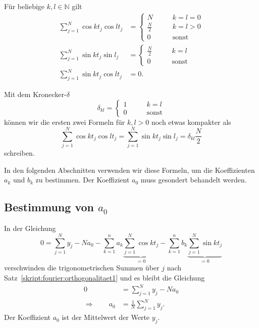 \begin{satz}
\label{skript:fourier:satzprodukte}
Für beliebige $k,l\in \mathbb N$ gilt
\begin{align*}
\sum_{j=1}^N
\cos kt_j \cos lt_j
&=
\begin{cases}
N                     &\qquad k=l=0\\
\displaystyle\frac{N}2&\qquad k=l > 0\\
0                     &\qquad\text{sonst}
\end{cases}
\\
\sum_{j=1}^N
\sin kt_j \sin l_j
&=
\begin{cases}
\displaystyle \frac{N}2&\qquad k=l\\
0                      &\qquad\text{sonst}
\end{cases}
\\
\sum_{j=1}^N
\sin kt_j \cos lt_j
&=
0.
\end{align*}
\end{satz}
Mit dem Kronecker-$\delta$ 
%
\[
\delta_{kl}
=
\begin{cases}
1&\qquad k=l\\
0&\qquad\text{sonst}
\end{cases}
\]
können wir die ersten zwei Formeln für $k,l>0$ noch etwas kompakter 
als
\begin{equation}
\sum_{j=1}^N
\cos kt_j \cos lt_j
=
\sum_{j=1}^N
\sin kt_j \sin l_j
=
\delta_{kl}\frac{N}2
\label{skript:fourier:trigsumsummary}
\end{equation}
schreiben.

In den folgenden Abschnitten verwenden wir diese Formeln, um die
Koeffizienten $a_k$ und $b_k$ zu bestimmen.
Der Koeffizient $a_0$ muss gesondert behandelt werden.

\subsection{Bestimmung von $a_0$}
In der Gleichung
\[
0
=
\sum_{j=1}^Ny_j
-Na_0
-\sum_{k=1}^na_k\underbrace{\sum_{j=1}^N\cos kt_j}_{\displaystyle=0}
-\sum_{k=1}^nb_k\underbrace{\sum_{j=1}^N\sin kt_j}_{\displaystyle=0}
\]
verschwinden die trigonometrischen Summen über $j$ nach
Satz~\ref{skript:fourier:orthogonalitaet1} und es bleibt die Gleichung
\begin{align*}
0
&=
\sum_{j=1}^Ny_j
-Na_0
\\
\Rightarrow\qquad
a_0&=\frac1{N}\sum_{j=1}^N y_j.
\end{align*}
Der Koeffizient $a_0$ ist der Mittelwert der Werte $y_j$.

